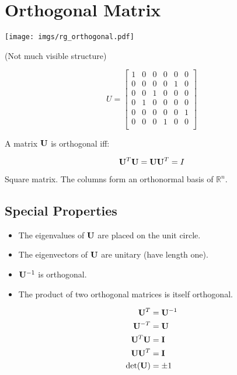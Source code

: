 \section{Orthogonal Matrix}

\begin{center}
\texttt{[image: imgs/rg\_orthogonal.pdf]}

(Not much visible structure)
\end{center}


\begin{equation}
U=
\begin{bmatrix}
1 & 0 & 0 & 0 & 0 & 0 \\
0 & 0 & 0 & 0 & 1 & 0 \\
0 & 0 & 1 & 0 & 0 & 0 \\
0 & 1 & 0 & 0 & 0 & 0 \\
0 & 0 & 0 & 0 & 0 & 1 \\
0 & 0 & 0 & 1 & 0 & 0 \\
\end{bmatrix}
\end{equation}

A matrix $\mathbf{U}$ is orthogonal iff:

\begin{equation}
\mathbf{U}^T \mathbf{U} = \mathbf{U} \mathbf{U}^T = I
\end{equation}

Square matrix. The columns form an orthonormal basis of $\mathbb{R}^n$.



\subsection*{Special Properties}

\begin{itemize}
\item The eigenvalues of $\mathbf{U}$ are placed on the unit circle.
\item The eigenvectors of $\mathbf{U}$ are unitary (have length one).
\item $\mathbf{U}^{-1}$ is orthogonal.
\item The product of two orthogonal matrices is itself orthogonal.
\end{itemize}

\begin{align}
\mathbf{U}^T     &= \mathbf{U}^{-1} \\
\mathbf{U}^{-T}  &= \mathbf{U}      \\
\mathbf{U}^T\mathbf{U}  &= \mathbf{I}      \\
\mathbf{U}\mathbf{U}^T  &= \mathbf{I}      \\
\det(\mathbf{U}) &= \pm1
\end{align}




